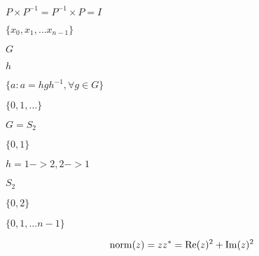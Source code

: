 \documentclass{article}
\begin{document}
$ P \times P^{-1} = P^{-1} \times P = I $
\pagebreak

$ \{x_0, x_1, \dots x_{n-1}\} $
\pagebreak

$ G $
\pagebreak

$ h $
\pagebreak

$ \{ a: a = h g h^{-1}, \forall g \in G \} $
\pagebreak

$ \{ 0, 1, \dots \} $
\pagebreak

$ G = S_2 $
\pagebreak

$ \{0,1\} $
\pagebreak

$ h = {1->2, 2->1} $
\pagebreak

$ S_2 $
\pagebreak

$ \{0,2\} $
\pagebreak

$ \{0, 1, \dots n-1\} $
\pagebreak

\[ {\rm norm}(z) = zz^* = {\rm Re}(z)^2 + {\rm Im}(z)^2 \]
\pagebreak
\end{document}
